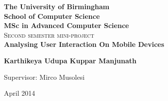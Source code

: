 \documentclass[12pt]{report}
\begin{document}
\begin{titlepage}
\begin{center}
\lstset{language=Java}  
\textbf{\LARGE The University of Birmingham}\\[0.35cm]
\textbf{\LARGE School of Computer Science}\\[0.35cm]
\textbf{\LARGE MSc in Advanced Computer Science}\\[2.5cm]

\textsc{\Large Second semester mini-project}\\[2.5cm]


{ \huge \bfseries Analysing User Interaction On Mobile Devices \\[1cm] }

{\large \textbf{Karthikeya Udupa Kuppar Manjunath}\\[1cm]}

\large{Supervisor: Mirco Musolesi}


\vfill

{\large April 2014}

\end{center}
\end{titlepage}
\end{document}

